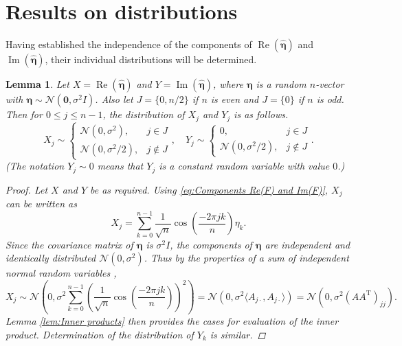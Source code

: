 \documentclass[12pt,notitlepage]{report}
\newcommand{\trans}{\mathrm{T}}	%
\newcommand{\noise}{\eta}	%
\newcommand{\noiseSD}{\sigma}	%
\newcommand{\noiseVec}{\bm{\noise}}	%
\renewcommand{\Re}{\operatorname{Re}}	%
\renewcommand{\Im}{\operatorname{Im}}	%
\newtheorem{lemma}{Lemma}[section]
\begin{document}
\section{Results on distributions} \label{sec:Results on distributions}

Having established the independence of the components of $\Re(\widehat{\noiseVec})$ and $\Im(\widehat{\noiseVec})$, their individual distributions will be determined. 

\begin{lemma}
\label{lem:Component distributions}
Let $X = \Re(\widehat{\noiseVec})$ and $Y = \Im(\widehat{\noiseVec})$, where $\noiseVec$ is a random $n$-vector with $\noiseVec \sim \mathcal{N}(\bm{0},\noiseSD^2 I)$. Also let $J = \{0,n/2\}$ if $n$ is even and $J = \{0\}$ if $n$ is odd. Then for $0 \leq j \leq n-1$, the distribution of $X_j$ and $Y_j$ is as follows.  
\[X_j \sim \begin{cases}
\mathcal{N}(0,\noiseSD^2), & j \in J \\
\mathcal{N}(0,\noiseSD^2/2), & j \not\in J \end{cases}, \quad Y_j \sim \begin{cases}
0, & j \in J \\
\mathcal{N}(0,\noiseSD^2/2), & j \not\in J
\end{cases}.\]
(The notation $Y_j \sim 0$ means that $Y_j$ is a constant random variable with value $0$.)
\begin{proof}
Let $X$ and $Y$ be as required. Using \eqref{eq:Components Re(F) and Im(F)}, $X_j$ can be written as
\[X_j = \sum_{k=0}^{n-1} \frac{1}{\sqrt{n}}\cos\left(\frac{-2\pi{jk}}{n}\right)\noise_k.\]
Since the covariance matrix of $\noiseVec$ is $\noiseSD^2 I$, the components of $\noiseVec$ are independent and identically distributed $\mathcal{N}(0,\noiseSD^2)$. Thus by the properties of a sum of independent normal random variables \cite[p.~184]{CasellaBerger02},
\[X_j \sim \mathcal{N}\left(0, \noiseSD^2\sum_{k=0}^{n-1} \left(\frac{1}{\sqrt{n}}\cos\left(\frac{-2\pi{jk}}{n}\right)\right)^2\right) = \mathcal{N}\left(0, \noiseSD^2 \langle A_{j\cdot},A_{j\cdot} \rangle\right) = \mathcal{N}\left(0, \noiseSD^2 (AA^\trans)_{jj}\right).\]
Lemma \ref{lem:Inner products} then provides the cases for evaluation of the inner product. Determination of the distribution of $Y_k$ is similar.
\end{proof}
\end{lemma}
\end{document}
